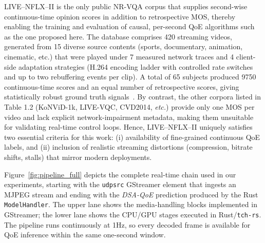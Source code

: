 LIVE--NFLX--II is the only public NR-VQA corpus that supplies second-wise continuous-time opinion scores in addition to retrospective MOS, thereby enabling the training and evaluation of causal, per-second QoE algorithms such as the one proposed here. The database comprises 420 streaming videos, generated from 15 diverse source contents (sports, documentary, animation, cinematic, etc.) that were played under 7 measured network traces and 4 client-side adaptation strategies (H.264 encoding ladder with controlled rate switches and up to two rebuffering events per clip). A total of 65 subjects produced 9750 continuous-time scores and an equal number of retrospective scores, giving statistically robust ground truth signals~\cite{live_nflx_conf}. By contrast, the other corpora listed in Table 1.2 (KoNViD-1k, LIVE-VQC, CVD2014, \emph{etc.}) provide only one MOS per video and lack explicit network-impairment metadata, making them unsuitable for validating real-time control loops. Hence, LIVE--NFLX--II uniquely satisfies two essential criteria for this work: (i) availability of fine-grained continuous QoE labels, and (ii) inclusion of realistic streaming distortions (compression, bitrate shifts, stalls) that mirror modern deployments.

Figure~\ref{fig:pipeline_full} depicts the complete real-time chain used in our experiments,
starting with the \texttt{udpsrc} GStreamer element that ingests an MJPEG stream
and ending with the \emph{DSA-QoE} prediction produced by the Rust
\texttt{ModelHandler}.  The upper lane shows the media-handling blocks
implemented in GStreamer; the lower lane shows the CPU/GPU stages executed
in Rust/\texttt{tch-rs}.  The pipeline runs continuously at 1Hz, so every decoded
frame is available for QoE inference within the same one-second window.

